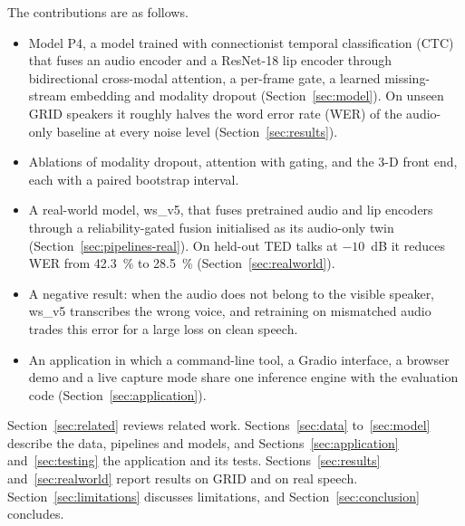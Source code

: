 The contributions are as follows.
\begin{itemize}
\item Model P4, a model trained with connectionist temporal classification (CTC) that fuses an audio encoder and a ResNet-18 lip encoder through
bidirectional cross-modal attention, a per-frame gate, a learned missing-stream embedding and
modality dropout (Section~\ref{sec:model}). On unseen GRID speakers it roughly halves the word error
rate (WER) of the audio-only baseline at every noise level (Section~\ref{sec:results}).
\item Ablations of modality dropout, attention with gating, and the 3-D front end, each with a
paired bootstrap interval.
\item A real-world model, ws\_v5, that fuses pretrained audio and lip encoders through a
reliability-gated fusion initialised as its audio-only twin (Section~\ref{sec:pipelines-real}).
On held-out TED talks at $-10$~dB it reduces WER from 42.3~\% to 28.5~\% (Section~\ref{sec:realworld}).
\item A negative result: when the audio does not belong to the visible speaker, ws\_v5 transcribes
the wrong voice, and retraining on mismatched audio trades this error for a large loss on clean
speech.
\item An application in which a command-line tool, a Gradio interface, a browser demo and a live
capture mode share one inference engine with the evaluation code (Section~\ref{sec:application}).
\end{itemize}

Section~\ref{sec:related} reviews related work. Sections~\ref{sec:data} to~\ref{sec:model} describe
the data, pipelines and models, and Sections~\ref{sec:application} and~\ref{sec:testing} the
application and its tests. Sections~\ref{sec:results} and~\ref{sec:realworld} report results on
GRID and on real speech. Section~\ref{sec:limitations} discusses limitations, and
Section~\ref{sec:conclusion} concludes.
